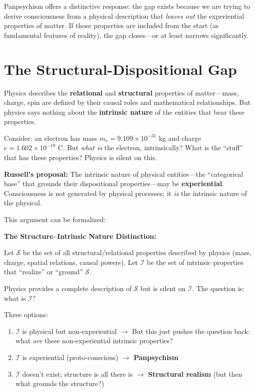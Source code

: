 \documentclass[11pt,a4paper]{report}
\begin{document}
Panpsychism offers a distinctive response: the gap exists because we are trying to derive consciousness from a physical description that \emph{leaves out} the experiential properties of matter. If those properties are included from the start (as fundamental features of reality), the gap closes---or at least narrows significantly.

\section{The Structural-Dispositional Gap}

\begin{argbox}
Physics describes the \textbf{relational} and \textbf{structural} properties of matter---mass, charge, spin are defined by their causal roles and mathematical relationships. But physics says nothing about the \textbf{intrinsic nature} of the entities that bear these properties.

Consider: an electron has mass $m_e = 9.109 \times 10^{-31}$ kg and charge $e = 1.602 \times 10^{-19}$ C. But \emph{what is} the electron, intrinsically? What is the ``stuff'' that has these properties? Physics is silent on this.

\textbf{Russell's proposal:} The intrinsic nature of physical entities---the ``categorical base'' that grounds their dispositional properties---may be \textbf{experiential}. Consciousness is not generated by physical processes; it \emph{is} the intrinsic nature of the physical.
\end{argbox}

This argument can be formalized:

\begin{mathbox}
\vspace{-6pt}
\textbf{The Structure--Intrinsic Nature Distinction:}

Let $\mathcal{S}$ be the set of all structural/relational properties described by physics (mass, charge, spatial relations, causal powers). Let $\mathcal{I}$ be the set of intrinsic properties that ``realize'' or ``ground'' $\mathcal{S}$.

Physics provides a complete description of $\mathcal{S}$ but is silent on $\mathcal{I}$. The question is: what is $\mathcal{I}$?

Three options:
\begin{enumerate}[leftmargin=1.5em]
  \item $\mathcal{I}$ is physical but non-experiential $\to$ But this just pushes the question back: what \emph{are} these non-experiential intrinsic properties?
  \item $\mathcal{I}$ is experiential (proto-conscious) $\to$ \textbf{Panpsychism}
  \item $\mathcal{I}$ doesn't exist; structure is all there is $\to$ \textbf{Structural realism} (but then what grounds the structure?)
\end{enumerate}
\vspace{-4pt}
\end{mathbox}
\end{document}
